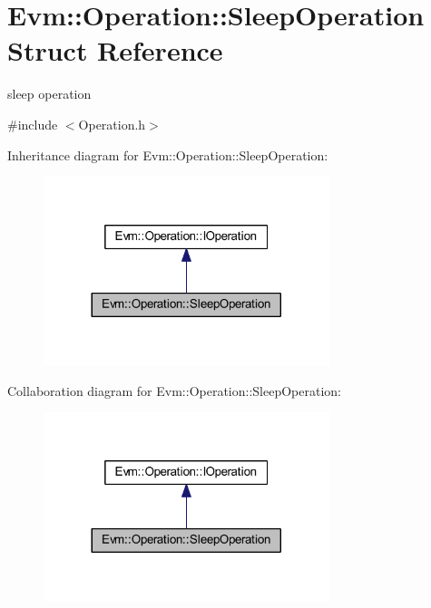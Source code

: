 \hypertarget{struct_evm_1_1_operation_1_1_sleep_operation}{}\section{Evm\+:\+:Operation\+:\+:Sleep\+Operation Struct Reference}
\label{struct_evm_1_1_operation_1_1_sleep_operation}


sleep operation  




{\ttfamily \#include $<$Operation.\+h$>$}



Inheritance diagram for Evm\+:\+:Operation\+:\+:Sleep\+Operation\+:
\nopagebreak
\begin{figure}[H]
\begin{center}
\leavevmode
\includegraphics[width=236pt]{struct_evm_1_1_operation_1_1_sleep_operation__inherit__graph}
\end{center}
\end{figure}


Collaboration diagram for Evm\+:\+:Operation\+:\+:Sleep\+Operation\+:
\nopagebreak
\begin{figure}[H]
\begin{center}
\leavevmode
\includegraphics[width=236pt]{struct_evm_1_1_operation_1_1_sleep_operation__coll__graph}
\end{center}
\end{figure}
